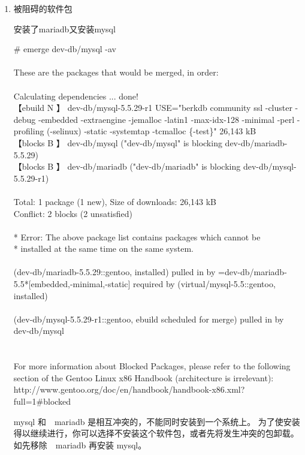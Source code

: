 \begin{enumerate}
\item 被阻碍的软件包

\begin{example}{安装了mariadb又安装mysql}


\begin{code}
\# emerge dev-db/mysql -av \\
\\
These are the packages that would be merged, in order:\\
\\
Calculating dependencies     ... done!\\
【ebuild  N     】 dev-db/mysql-5.5.29-r1 USE="berkdb community ssl -cluster -debug -embedded -extraengine -jemalloc -latin1 -max-idx-128 -minimal -perl -profiling (-selinux) -static -systemtap -tcmalloc \{-test\}" 26,143 kB\\
【blocks B      】 dev-db/mysql ("dev-db/mysql" is blocking dev-db/mariadb-5.5.29)\\
【blocks B      】 dev-db/mariadb ("dev-db/mariadb" is blocking dev-db/mysql-5.5.29-r1)\\
\\
Total: 1 package (1 new), Size of downloads: 26,143 kB\\
Conflict: 2 blocks (2 unsatisfied)\\
\\
 * Error: The above package list contains packages which cannot be\\
 * installed at the same time on the same system.\\
\\
  (dev-db/mariadb-5.5.29::gentoo, installed) pulled in by
    =dev-db/mariadb-5.5*[embedded,-minimal,-static] required by (virtual/mysql-5.5::gentoo, installed)\\
\\
  (dev-db/mysql-5.5.29-r1::gentoo, ebuild scheduled for merge) pulled in by
    dev-db/mysql\\
\\
\\
For more information about Blocked Packages, please refer to the following
section of the Gentoo Linux x86 Handbook (architecture is irrelevant):
\\
http://www.gentoo.org/doc/en/handbook/handbook-x86.xml?full=1\#blocked
\end{code}

mysql 和　mariadb 是相互冲突的，不能同时安装到一个系统上。
为了使安装得以继续进行，你可以选择不安装这个软件包，或者先将发生冲突的包卸载。如先移除　mariadb 再安装 mysql。
\end{example}



\end{enumerate}
